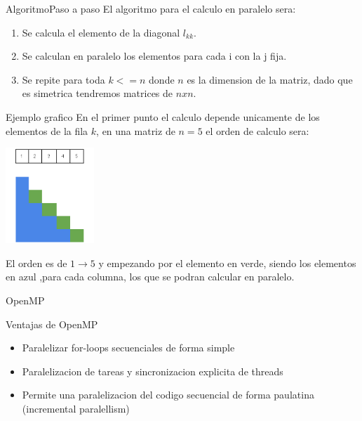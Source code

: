 \documentclass{beamer}
\begin{document}
\begin{frame}{Algoritmo}{Paso a paso}
El algoritmo para el calculo en paralelo sera:

\begin{enumerate}
\item Se calcula el elemento de la diagonal  $l_{kk}$.
\item Se calculan en paralelo los elementos para cada i con la j fija.
\item Se repite para toda $k <=n$ donde $n$ es la dimension de la matriz, dado que es simetrica tendremos matrices de $nxn$.
\end{enumerate}
\end{frame}

\begin{frame}{Ejemplo grafico}
En el primer punto el calculo depende unicamente de los elementos de la fila $k$, en una matriz de $n=5$ el orden de calculo sera:

\begin{center}
	\includegraphics[width=0.25\textwidth]{MatrixBlue}
\end{center}

El orden es de $1 \to 5$ y empezando por el elemento en verde, siendo los elementos en azul ,para cada columna, los que se podran calcular en paralelo.
\end{frame}


\begin{frame}{OpenMP}
\begin{block}{Ventajas de OpenMP}
\begin{itemize}
\item Paralelizar for-loops secuenciales de forma simple
\item Paralelizacion de tareas y sincronizacion explicita de threads
\item Permite una paralelizacion del codigo secuencial de forma paulatina (incremental paralellism)
\end{itemize}
\end{block}
\end{frame}
\end{document}
